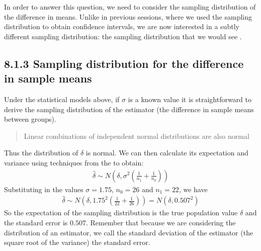 \documentclass[letterpaper,10pt,english]{jupyterBook}
\begin{document}
\sphinxAtStartPar
In order to answer this question, we need to consider the sampling distribution of the difference in means. Unlike in previous sessions, where we used the sampling distribution to obtain confidence intervals, we are now interested in a subtly different sampling distribution: the sampling distribution that we would see .


\subsection{8.1.3 Sampling distribution for the difference in sample means}
\label{\detokenize{08.b. Frequentist II:sampling-distribution-for-the-difference-in-sample-means}}
\sphinxAtStartPar
Under the statistical models above, if \(\sigma\) is a known value it is straightforward to derive the sampling distribution of the estimator (the difference in sample means between groups).
\begin{quote}

\sphinxAtStartPar
Linear combinations of independent normal distributions are also normal
\end{quote}

\sphinxAtStartPar
Thus the distribution of \(\hat{\delta}\) is normal. We can then calculate its expectation and variance using techniques from the  to obtain:
\begin{equation*}
\begin{split}
\hat{\delta} \sim N\left(\delta, \sigma^2 \left(\frac{1}{n_1} + \frac{1}{n_0} \right) \right)
\end{split}
\end{equation*}
\sphinxAtStartPar
Substituting in the values \(\sigma = 1.75\), \(n_0 = 26\) and \(n_1 = 22\), we have
\begin{equation*}
\begin{split}
\hat{\delta} \sim N\left(\delta, 1.75^2 \left(\frac{1}{22} + \frac{1}{26} \right) \right) = N(\delta,  0.507^2)  
\end{split}
\end{equation*}
\sphinxAtStartPar
So the expectation of the sampling distribution is the true population value \(\delta\) and the standard error is \(0.507\). Remember that because we are considering the distribution of an estimator, we call the standard deviation of the estimator (the square root of the variance) the standard error.

\sphinxAtStartPar
{}
\end{document}
